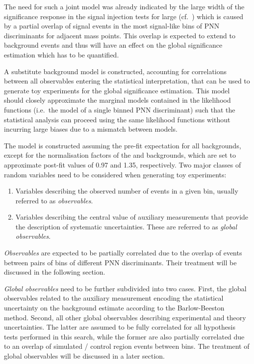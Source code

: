 The need for such a joint model was already indicated by the large
width of the significance response in the signal injection tests for
large \mX (cf.~) which is caused by a
partial overlap of signal events in the most signal-like bins of PNN
discriminants for adjacent mass points. This overlap is expected to
extend to background events and thus will have an effect on the global
significance estimation which has to be quantified.

A substitute background model is constructed, accounting for
correlations between all observables entering the statistical
interpretation, that can be used to generate toy experiments for the
global significance estimation. This model should closely approximate
the marginal models contained in the likelihood functions (i.e.\ the
model of a single binned PNN discriminant) such that the statistical
analysis can proceed using the same likelihood functions without
incurring large biases due to a mismatch between models.

The model is constructed assuming the pre-fit expectation for all
backgrounds, except for the normalisation factors of the \ttbar and
\ZHF backgrounds, which are set to approximate post-fit values of 0.97
and 1.35, respectively. Two major classes of random variables need to
be considered when generating toy experiments:
\begin{enumerate}
\item Variables describing the observed number of events in a given
  bin, usually referred to as \emph{observables}.

\item Variables describing the central value of auxiliary measurements
  that provide the description of systematic uncertainties. These are
  referred to as \emph{global observables}.
\end{enumerate}

\emph{Observables} are expected to be partially correlated due to the
overlap of events between pairs of bins of different PNN
discriminants. Their treatment will be discussed in the following
section.

\emph{Global observables} need to be further subdivided into two
cases. First, the global observables related to the auxiliary
measurement encoding the statistical uncertainty on the background
estimate %
according to the Barlow-Beeston method. Second, all other global
observables describing experimental and theory uncertainties. The
latter are assumed to be fully correlated for all hypothesis tests
performed in this search, while the former are also partially
correlated due to an overlap of simulated / control region events
between bins. The treatment of global observables will be discussed in
a later section.

